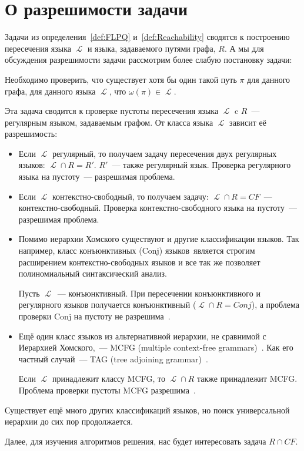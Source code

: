 \section{О разрешимости задачи}
	\label{sec:FLPQ_Decidability}

Задачи из определения~\ref{def:FLPQ} и~\ref{def:Reachability} сводятся к построению пересечения языка $\mscrL$ и языка, задаваемого путями графа, $R$.
А мы для обсуждения разрешимости задачи рассмотрим более слабую постановку задачи:

\begin{definition}
    Необходимо проверить, что существует хотя бы один такой путь $\pi$ для данного графа, для данного языка $\mscrL$, что $\omega(\pi) \in \mscrL$.
\end{definition}

Эта задача сводится к проверке пустоты пересечения языка $\mscrL$ c $R$~--- регулярным языком, задаваемым графом.
От класса языка $\mscrL$ зависит её разрешимость:
\begin{itemize}
    \item Если $\mscrL$ регулярный, то получаем задачу пересечения двух регулярных языков: $\mscrL \cap R = R'$.
          $R'$~--- также регулярный язык.
          Проверка регулярного языка на пустоту~--- разрешимая проблема.
    \item Если $\mscrL$ контекстно-свободный, то получаем задачу: $\mscrL \cap R = CF$~--- контекстно-свободный.
          Проверка контекстно-свободного языка на пустоту~--- разрешимая проблема.
    \item Помимо иерархии Хомского существуют и другие классификации языков.
          Так например, класс конъюнктивных (Conj) языков~является строгим расширением контекстно-свободных языков и все так же позволяет полиномиальный синтаксический анализ.

          Пусть $\mscrL$~--- конъюнктивный.
          При пересечении конъюнктивного и регулярного языков получается конъюнктивный ($\mscrL \cap R = Conj$), а проблема проверки Conj на пустоту не разрешима~.
    \item Ещё один класс языков из альтернативной иерархии, не сравнимой с Иерархией Хомского,~--- MCFG (multiple context-free grammars)~.
          Как его частный случай~--- TAG (tree adjoining grammar)~.

          Если $\mscrL$ принадлежит классу MCFG, то $\mscrL \cap R$ также принадлежит MCFG.
          Проблема проверки пустоты MCFG разрешима~.
\end{itemize}

Существует ещё много других классификаций языков, но поиск универсальной иерархии до сих пор продолжается.


Далее, для изучения алгоритмов решения, нас будет интересовать задача $R \cap CF$.
